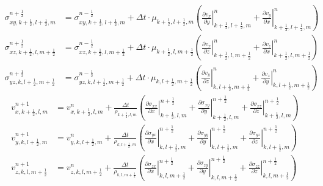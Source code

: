 \documentclass[pdftex,a4paper,parskip,listof=totoc,bibliography=totoc,onehalfspacing,12pt]{scrreprt}
\begin{document}
\begin{align*}
	\sigma_{xy,k+\frac{1}{2},l+\frac{1}{2},m}^{n+\frac{1}{2}} &= \sigma_{xy,k+\frac{1}{2},l+\frac{1}{2},m}^{n-\frac{1}{2}} + \Delta t \cdot \mu_{k+\frac{1}{2},l+\frac{1}{2},m} \left( \left.\frac{\partial v_x}{\partial y}\right\rvert_{k+\frac{1}{2},l+\frac{1}{2},m}^n + \left.\frac{\partial v_y}{\partial x}\right\rvert_{k+\frac{1}{2},l+\frac{1}{2},m}^n \right)\\
	\sigma_{xz,k+\frac{1}{2},l,m+\frac{1}{2}}^{n+\frac{1}{2}} &= \sigma_{xz,k+\frac{1}{2},l,m+\frac{1}{2}}^{n-\frac{1}{2}} + \Delta t \cdot \mu_{k+\frac{1}{2},l,m+\frac{1}{2}} \left( \left.\frac{\partial v_x}{\partial z}\right\rvert_{k+\frac{1}{2},l,m+\frac{1}{2}}^n + \left.\frac{\partial v_z}{\partial x}\right\rvert_{k+\frac{1}{2},l,m+\frac{1}{2}}^n \right)\\
	\sigma_{yz,k,l+\frac{1}{2},m+\frac{1}{2}}^{n+\frac{1}{2}} &= \sigma_{yz,k,l+\frac{1}{2},m+\frac{1}{2}}^{n-\frac{1}{2}} + \Delta t \cdot \mu_{k,l+\frac{1}{2},m+\frac{1}{2}} \left( \left.\frac{\partial v_y}{\partial z}\right\rvert_{k,l+\frac{1}{2},m+\frac{1}{2}}^n + \left.\frac{\partial v_z}{\partial y}\right\rvert_{k,l+\frac{1}{2},m+\frac{1}{2}}^n \right)
\end{align*}
\begin{align*}
	v_{x,k+\frac{1}{2},l,m}^{n+1} &= v_{x,k+\frac{1}{2},l,m}^n + \frac{\Delta t}{\rho_{k+\frac{1}{2},l,m}}  \left( \left.\frac{\partial\sigma_{xx}}{\partial x}\right\rvert_{k+\frac{1}{2},l,m}^{n+\frac{1}{2}} + \left.\frac{\partial\sigma_{xy}}{\partial y}\right\rvert_{k+\frac{1}{2},l,m}^{n+\frac{1}{2}} + \left.\frac{\partial\sigma_{xz}}{\partial z}\right\rvert_{k+\frac{1}{2},l,m}^{n+\frac{1}{2}} \right)\\
	v_{y,k,l+\frac{1}{2},m}^{n+1} &= v_{y,k,l+\frac{1}{2},m}^n + \frac{\Delta t}{\rho_{k,l+\frac{1}{2},m}}  \left( \left.\frac{\partial\sigma_{yx}}{\partial x}\right\rvert_{k,l+\frac{1}{2},m}^{n+\frac{1}{2}} + \left.\frac{\partial\sigma_{yy}}{\partial y}\right\rvert_{k,l+\frac{1}{2},m}^{n+\frac{1}{2}} + \left.\frac{\partial\sigma_{yz}}{\partial z}\right\rvert_{k,l+\frac{1}{2},m}^{n+\frac{1}{2}} \right)\\
	v_{z,k,l,m+\frac{1}{2}}^{n+1} &= v_{z,k,l,m+\frac{1}{2}}^n + \frac{\Delta t}{\rho_{k,l,m+\frac{1}{2}}}  \left( \left.\frac{\partial\sigma_{zx}}{\partial x}\right\rvert_{k,l,m+\frac{1}{2}}^{n+\frac{1}{2}} + \left.\frac{\partial\sigma_{zy}}{\partial y}\right\rvert_{k,l,m+\frac{1}{2}}^{n+\frac{1}{2}} + \left.\frac{\partial\sigma_{zz}}{\partial z}\right\rvert_{k,l,m+\frac{1}{2}}^{n+\frac{1}{2}} \right)
\end{align*}
\end{document}

